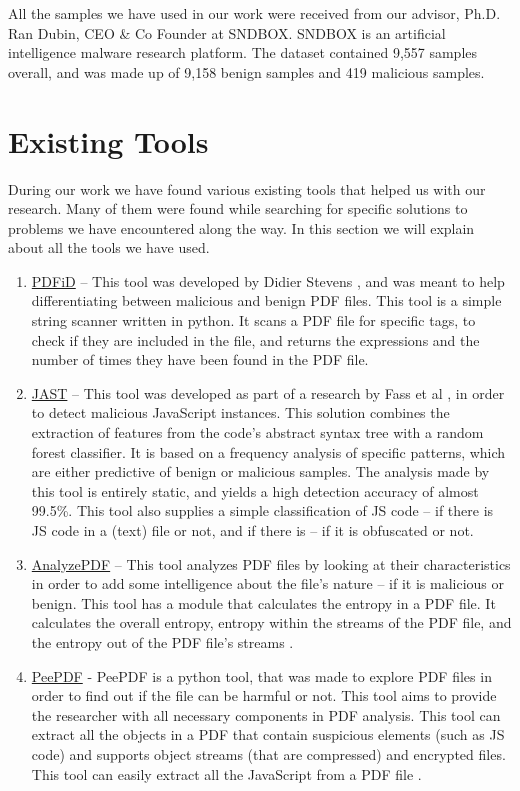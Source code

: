 \documentclass{article}
\begin{document}
\indent All the samples we have used in our work were received from our advisor, Ph.D. Ran Dubin, CEO \& Co Founder at SNDBOX. SNDBOX is an artificial intelligence malware research platform. The dataset contained 9,557 samples overall, and was made up of 9,158 benign samples and 419 malicious samples.

\section{Existing Tools}
\indent During our work we have found various existing tools that helped us with our research. Many of them were found while searching for specific solutions to problems we have encountered along the way. In this section we will explain about all the tools we have used.
\begin{enumerate}
	\item \underline{PDFiD} – This tool was developed by Didier Stevens \cite{1}, and was meant to help differentiating between malicious and benign PDF files. This tool is a simple string scanner written in python. It scans a PDF file for specific tags, to check if they are included in the file, and returns the expressions and the number of times they have been found in the PDF file.
	\item \underline{JAST} – This tool was developed as part of a research by Fass et al \cite{JAST2018}, in order to detect malicious JavaScript instances. This solution combines the extraction of features from the code's abstract syntax tree with a random forest classifier. It is based on a frequency analysis of specific patterns, which are either predictive of benign or malicious samples. The analysis made by this tool is entirely static, and yields a high detection accuracy of almost 99.5\%. This tool also supplies a simple classification of JS code – if there is JS code in a (text) file or not, and if there is – if it is obfuscated or not.
	\item \underline{AnalyzePDF} – This tool analyzes PDF files by looking at their characteristics in order to add some intelligence about the file's nature – if it is malicious or benign. This tool has a module that calculates the entropy in a PDF file. It calculates the overall entropy, entropy within the streams of the PDF file, and the entropy out of the PDF file's streams \cite{AnalyzePDF2014}.
	\item \underline{PeePDF} - PeePDF is a python tool, that was made to explore PDF files in order to find out if the file can be harmful or not. This tool aims to provide the researcher with all necessary components in PDF analysis. This tool can extract all the objects in a PDF that contain suspicious elements (such as JS code) and supports object streams (that are compressed) and encrypted files. This tool can easily extract all the JavaScript from a PDF file \cite{Peepdf2016}.
\end{enumerate}
\end{document}
